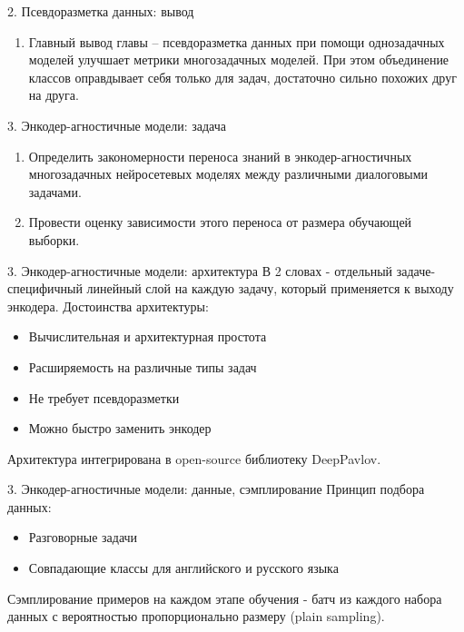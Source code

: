 \begin{frame}{2. Псевдоразметка данных: вывод}
\begin{enumerate}

\item Главный вывод главы -- псевдоразметка данных при помощи однозадачных моделей улучшает метрики многозадачных моделей. При этом объединение классов оправдывает себя только для задач, достаточно сильно похожих друг на друга. 
\end{enumerate}
\end{frame}

\begin{frame}{3. Энкодер-агностичные модели: задача}
\begin{enumerate}
    \item Определить закономерности переноса знаний в энкодер-агностичных многозадачных нейросетевых моделях между различными диалоговыми задачами.
    \item Провести оценку зависимости этого переноса от размера обучающей выборки.
 \end{enumerate}
\end{frame}

\begin{frame}{3. Энкодер-агностичные модели: архитектура}
В 2 словах - отдельный задаче-специфичный линейный слой на каждую задачу, который применяется к выходу энкодера.
Достоинства архитектуры:
\begin{itemize}
  \item Вычислительная и архитектурная простота
  \item Расширяемость на различные типы задач
  \item Не требует псевдоразметки
  \item Можно быстро заменить энкодер
\end{itemize}
Архитектура интегрирована в open-source библиотеку DeepPavlov.
\end{frame}

\begin{frame}{3. Энкодер-агностичные модели: данные, сэмплирование}
Принцип подбора данных:
\begin{itemize}
    \item Разговорные задачи
    \item Совпадающие классы для английского и русского языка
\end{itemize}
Сэмплирование примеров на каждом этапе обучения - батч из каждого набора данных с вероятностью пропорционально размеру (plain sampling).
\end{frame}

